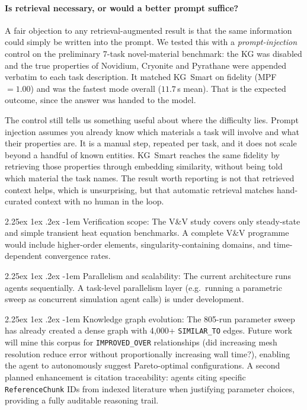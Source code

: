 \documentclass[preprint,review,12pt]{elsarticle}
\makeatletter
\renewcommand\paragraph{\@startsection{paragraph}{4}{\z@}%
  {2.25ex \@plus1ex \@minus.2ex}%
  {-1em}%
  {\normalfont\normalsize\bfseries}}
\newif\ifrevisionsvisible
\newcommand{\revised}[1]{%
  \ifrevisionsvisible\textcolor{revisionred}{#1}\else#1\fi}
\makeatother
\begin{document}
\revised{\paragraph{Is retrieval necessary, or would a better prompt suffice?}
A fair objection to any retrieval-augmented result is that the same
information could simply be written into the prompt.  We tested this with
a \emph{prompt-injection} control on the preliminary 7-task
novel-material benchmark: the KG was disabled and the true properties of
Novidium, Cryonite and Pyrathane were appended verbatim to each task
description.  It matched KG~Smart on fidelity (MPF~$=1.00$) and was the
fastest mode overall ($11.7$\,s mean).  That is the expected outcome,
since the answer was handed to the model.}

\revised{The control still tells us something useful about where the
difficulty lies.  Prompt injection assumes you already know which
materials a task will involve and what their properties are.  It is a
manual step, repeated per task, and it does not scale beyond a handful of
known entities.  KG~Smart reaches the same fidelity by retrieving those
properties through embedding similarity, without being told which
material the task names.  The result worth reporting is not that
retrieved context helps, which is unsurprising, but that automatic
retrieval matches hand-curated context with no human in the loop.}

\paragraph{Verification scope:}
The V\&V study covers only steady-state and simple transient heat
equation benchmarks.  A complete V\&V programme would include
higher-order elements, singularity-containing domains, and
time-dependent convergence rates.

\paragraph{Parallelism and scalability:}
The current architecture runs agents sequentially.  A task-level
parallelism layer (e.g.\ running a parametric sweep as concurrent
simulation agent calls) is under development.

\paragraph{Knowledge graph evolution:}
The 805-run parameter sweep has already created a dense graph with
4{,}000+ \texttt{SIMILAR\_TO} edges.  Future work will mine this corpus
for \texttt{IMPROVED\_OVER} relationships (did increasing mesh resolution
reduce error without proportionally increasing wall time?), enabling the
agent to autonomously suggest Pareto-optimal configurations.  A second
planned enhancement is citation traceability: agents citing specific
\texttt{ReferenceChunk} IDs from indexed literature when justifying
parameter choices, providing a fully auditable reasoning trail.
\end{document}
